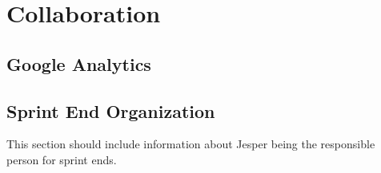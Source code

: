 \chapter{Collaboration}\label{chap:collaboration}

\section{Google Analytics}


\section{Sprint End Organization}\label{sec:collab:sprintend}

This section should include information about Jesper being the responsible person for sprint ends.
